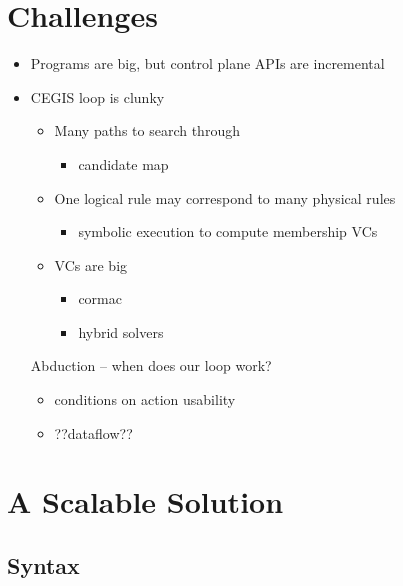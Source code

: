 \section{Challenges}
\begin{itemize}
\item Programs are big, but control plane APIs are incremental
\item CEGIS loop is clunky
  \begin{itemize}
  \item Many paths to search through
    \begin{itemize} \item candidate map \end{itemize}
  \item One logical rule may correspond to many physical rules
    \begin{itemize} \item symbolic execution to compute membership VCs \end{itemize}
  \item VCs are big
    \begin{itemize}
    \item cormac
    \item hybrid solvers
    \end{itemize}
  \end{itemize}
Abduction -- when does our loop work?
  \begin{itemize}
  \item conditions on action usability
  \item ??dataflow??
  \end{itemize}
\end{itemize}

\section{A Scalable Solution}

\subsection{Syntax}

